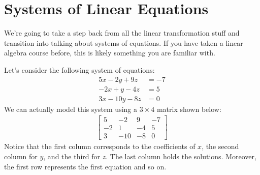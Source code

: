 \section{Systems of Linear Equations}
We're going to take a step back from all the linear transformation stuff and transition into talking about systems of equations. If you have taken a linear algebra course before, this is likely something you are familiar with. 

Let's consider the following system of equations:
\begin{align*}
    5x-2y+9z&=-7\\
    -2x+y-4z&=5\\
    3x-10y-8z&=0
\end{align*}
We can actually model this system using a $3\times 4$ matrix shown below:
\begin{align*}
    \left[\begin{array}{ccc|c}
        5 & -2 & 9 & -7 \\
        -2 & 1 & -4 & 5 \\
        3 & -10 & -8 & 0
    \end{array}\right]
\end{align*}
Notice that the first column corresponds to the coefficients of $x$, the second column for $y$, and the third for $z$. The last column holds the solutions. Moreover, the first row represents the first equation and so on.

